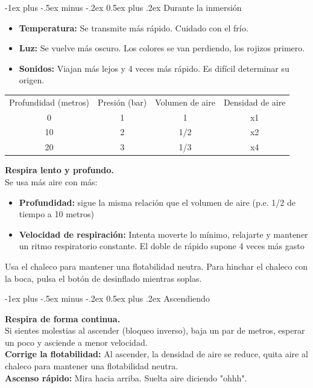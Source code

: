 \documentclass[10pt,landscape]{article}
\makeatletter
\renewcommand{\section}{\@startsection{section}{1}{0mm}%
                                {-1ex plus -.5ex minus -.2ex}%
                                {0.5ex plus .2ex}%
                                {\normalfont\large\bfseries}}
\makeatother
\begin{document}
\begin{multicols*}{3}
\section{Durante la inmersión}
\begin{itemize}
\item  \textbf{Temperatura:} Se transmite más rápido. Cuidado con el frío.
\item  \textbf{Luz:} Se vuelve más oscuro. Los colores se van perdiendo, los rojizos primero.
\item  \textbf{Sonidos:} Viajan más lejos y 4 veces más rápido. Es difícil determinar su origen.
\end{itemize}

\begin{center}
\renewcommand{\arraystretch}{1.2}
\begin{tabular}{ |c|c|c|c| } 
\hline
\multirow{2}{0.2\columnwidth}{Profundidad (metros)} & \multirow{2}{0.2\columnwidth}{Presión (bar)} & \multirow{2}{0.2\columnwidth}{Volumen de aire} & \multirow{2}{0.2\columnwidth}{Densidad de aire} \\
 &  & & \\ 
 \hline
 \hline
0 & 1 & 1 & x1 \\ 
 \hline
10 & 2 & 1/2 & x2 \\ 
 \hline
20 & 3 & 1/3 & x4 \\ 
\hline
\end{tabular}
\end{center}

\textbf{Respira lento y profundo.}\\
Se usa más aire con más:
\begin{itemize}
\item \textbf{Profundidad:} sigue la misma relación que el volumen de aire (p.e. 1/2 de tiempo a 10 metros)
\item \textbf{Velocidad de respiración:} Intenta moverte lo mínimo, relajarte y mantener un ritmo respiratorio constante. El doble de rápido supone 4 veces más gasto
\end{itemize}
Usa el chaleco para mantener una flotabilidad neutra. Para hinchar el chaleco con la boca, pulsa el botón de desinflado mientras soplas.


\section{Ascendiendo}

\textbf{Respira de forma continua.}\\
Si sientes molestias al ascender (bloqueo inverso), baja un par de metros, esperar un poco y asciende a menor velocidad.\\
\textbf{Corrige la flotabilidad:} Al ascender, la densidad de aire se reduce, quita aire al chaleco para mantener una flotabilidad neutra.\\
\textbf{Ascenso rápido:} Mira hacia arriba. Suelta aire diciendo "ohhh".


\end{multicols*}
\end{document}
